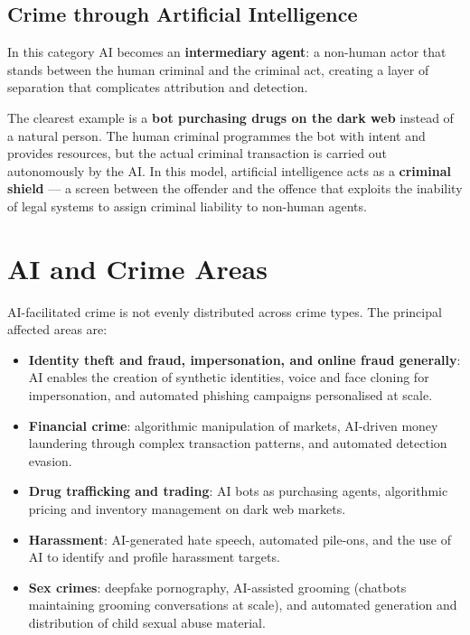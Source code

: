 \documentclass[11pt,a4paper,openany]{report}
\theoremstyle{definition}
\theoremstyle{plain}
\theoremstyle{remark}
\begin{document}
\subsection{Crime through Artificial Intelligence}

In this category AI becomes an \textbf{intermediary agent}: a non-human actor that stands between the human criminal and the criminal act, creating a layer of separation that complicates attribution and detection.

The clearest example is a \textbf{bot purchasing drugs on the dark web} instead of a natural person. The human criminal programmes the bot with intent and provides resources, but the actual criminal transaction is carried out autonomously by the AI. In this model, artificial intelligence acts as a \textbf{criminal shield} --- a screen between the offender and the offence that exploits the inability of legal systems to assign criminal liability to non-human agents.

\section{AI and Crime Areas}

AI-facilitated crime is not evenly distributed across crime types. The principal affected areas are:

\begin{itemize}
    \item \textbf{Identity theft and fraud, impersonation, and online fraud generally}: AI enables the creation of synthetic identities, voice and face cloning for impersonation, and automated phishing campaigns personalised at scale.
    \item \textbf{Financial crime}: algorithmic manipulation of markets, AI-driven money laundering through complex transaction patterns, and automated detection evasion.
    \item \textbf{Drug trafficking and trading}: AI bots as purchasing agents, algorithmic pricing and inventory management on dark web markets.
    \item \textbf{Harassment}: AI-generated hate speech, automated pile-ons, and the use of AI to identify and profile harassment targets.
    \item \textbf{Sex crimes}: deepfake pornography, AI-assisted grooming (chatbots maintaining grooming conversations at scale), and automated generation and distribution of child sexual abuse material.
\end{itemize}
\end{document}
